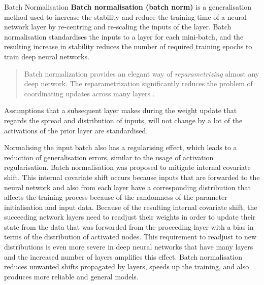     \begin{pabox}{Batch Normalisation}
    \label{def:batch-normalisation-definition}
      \textbf{Batch normalisation (batch norm)} is a generalisation method used to increase the stability and reduce the training time of a neural network layer by re-centring and re-scaling the inputs of the layer.
      Batch normalisation standardises the inputs to a layer for each mini-batch, and the resulting increase in stability reduces the number of required training epochs to train deep neural networks.

      \begin{quote}
        Batch normalization provides an elegant way of \emph{reparametrizing} almost any deep network. 
        The reparametrization significantly reduces the problem of coordinating updates across many layers \cite{goodfellowDeepLearning2016}.
      \end{quote}
      Assumptions that a subsequent layer makes during the weight update that regards the spread and distribution of inputs, will not change by a lot of the activations of the prior layer are standardised. 
    \end{pabox}
    \raggedbottom
    Normalising the input batch also has a regularising effect, which leads to a reduction of generalisation errors, similar to the usage of activation regularisation.
    Batch normalisation was proposed to mitigate internal covariate shift. This internal covariate shift occurs because inputs that are forwarded to the neural network and also from each layer have a corresponding distribution that affects the training process because of the randomness of the parameter initialisation and input data.
    Because of the resulting internal covariate shift, the succeeding network layers need to readjust their weights in order to update their state from the data that was forwarded from the proceeding layer with a bias in terms of the distribution of activated nodes. This requirement to readjust to new distributions is even more severe in deep neural networks that have many layers and the increased number of layers amplifies this effect. Batch normalisation reduces unwanted shifts propagated by layers, speeds up the training, and also produces more reliable and general models.
    


